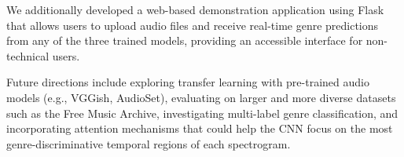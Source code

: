 \documentclass[10pt,journal]{IEEEtran}
\begin{document}
We additionally developed a web-based demonstration application using Flask that allows users to upload audio files and receive real-time genre predictions from any of the three trained models, providing an accessible interface for non-technical users.

Future directions include exploring transfer learning with pre-trained audio models (e.g., VGGish, AudioSet), evaluating on larger and more diverse datasets such as the Free Music Archive, investigating multi-label genre classification, and incorporating attention mechanisms that could help the CNN focus on the most genre-discriminative temporal regions of each spectrogram.



\end{document}
